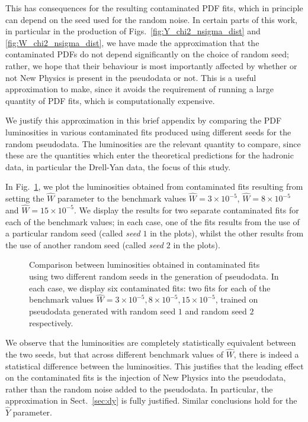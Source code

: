 \documentclass[withindex,glossary]{cam-thesis}
\begin{document}
This has consequences for the resulting contaminated PDF fits, which in principle can depend on the seed used for the random noise. In certain parts of this work, in particular in the production of Figs.~\ref{fig:Y_chi2_nsigma_dist} and \ref{fig:W_chi2_nsigma_dist}, we have made the approximation that the contaminated PDFs do not depend significantly on the choice of random seed; rather, we hope that their behaviour is most importantly affected by whether or not New Physics is present in the pseudodata or not. This is a useful approximation to make, since it avoids the requirement of running a large quantity of PDF fits, which is computationally expensive.

We justify this approximation in this brief appendix by comparing the PDF luminosities in various contaminated fits produced using different seeds for the random pseudodata. The luminosities are the relevant quantity to compare, since these are the quantities which enter the theoretical predictions for the hadronic data, in particular the Drell-Yan data, the focus of this study.

In Fig.~\ref{fig:lumi_random}, we plot the luminosities obtained
from contaminated fits resulting from setting the $\hat{W}$ parameter to the benchmark values $\hat{W} = 3 \times 10^{-5}$, $\hat{W} = 8 \times 10^{-5}$ and $\hat{W} = 15 \times 10^{-5}$. We display the results for two separate contaminated fits for each of the benchmark values; in each case, one of the fits results from the use of a particular random seed (called \textit{seed $1$} in the plots), whilst the other results from the use of another random seed (called \textit{seed $2$} in the plots). 
 \begin{figure}[h!]
  \caption{Comparison between luminosities obtained in contaminated fits using two different random seeds in the generation of pseudodata. In each case, we display six contaminated fits: two fits for each of the benchmark values $\hat{W} = 3 \times 10^{-5}, 8 \times 10^{-5}, 15 \times 10^{-5}$, trained on pseudodata generated with random seed $1$ and random seed $2$ respectively.}
\label{fig:lumi_random}
\end{figure}
We observe that the luminosities are completely statistically equivalent between the two seeds, but that across different benchmark values of $\hat{W}$, there is indeed a statistical difference between the luminosities. This justifies that the leading effect on the contaminated fits is the injection of New Physics into the pseudodata, rather than the random noise added to the pseudodata. In particular, the approximation in Sect.~\ref{sec:dy} is fully justified. Similar conclusions hold for the $\hat{Y}$ parameter.
\end{document}
